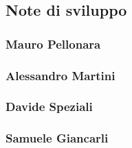 \subsection{Note di sviluppo}
\subsubsection*{Mauro Pellonara} 

\subsubsection*{Alessandro Martini}

\subsubsection*{Davide Speziali}

\subsubsection*{Samuele Giancarli}
